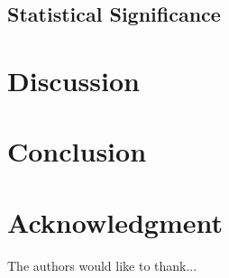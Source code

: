 \documentclass[journal]{IEEEtran}
\begin{document}
\subsection{Statistical Significance}

\section{Discussion}
\label{sec:discussion}


\section{Conclusion}
\label{sec:conclusion}


\section*{Acknowledgment}
The authors would like to thank...



\end{document}
